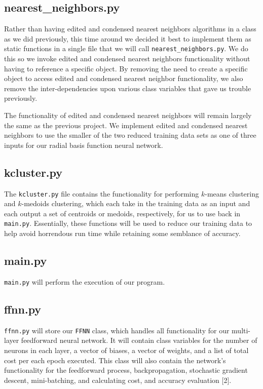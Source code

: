 \documentclass{article}
\begin{document}
\subsection*{nearest\_neighbors.py}

Rather than having edited and condensed nearest neighbors algorithms in a class as we did previously, this time around we decided it best to implement them as static functions in a single file that we will call \texttt{nearest\_neighbors.py}. We do this so we invoke edited and condensed nearest neighbors functionality without having to reference a specific object. By removing the need to create a specific object to access edited and condensed nearest neighbor functionality, we also remove the inter-dependencies upon various class variables that gave us trouble previously.

The functionality of edited and condensed nearest neighbors will remain largely the same as the previous project. We implement edited and condensed nearest neighbors to use the smaller of the two reduced training data sets as one of three inputs for our radial basis function neural network.

\subsection*{kcluster.py}

The \texttt{kcluster.py} file contains the functionality for performing $k$-means clustering and $k$-medoids clustering, which each take in the training data as an input and each output a set of centroids or medoids, respectively, for us to use back in \texttt{main.py}. Essentially, these functions will be used to reduce our training data to help avoid horrendous run time while retaining some semblance of accuracy.

\subsection*{main.py}
\texttt{main.py} will perform the execution of our program.

\subsection*{ffnn.py}
\texttt{ffnn.py} will store our \texttt{FFNN} class, which handles all functionality for our multi-layer feedforward neural network. It will contain class variables for the number of neurons in each layer, a vector of biases, a vector of weights, and a list of total cost per each epoch executed. This class will also contain the network's functionality for the feedforward process, backpropagation, stochastic gradient descent, mini-batching, and calculating cost, and accuracy evaluation [2].
\end{document}
